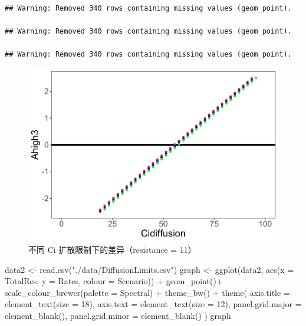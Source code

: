 \documentclass[
]{krantz}
\makeatletter
\newenvironment{Shaded}{\begin{snugshade}}{\end{snugshade}}
\newcommand{\AttributeTok}[1]{\textcolor[rgb]{0.77,0.63,0.00}{#1}}
\newcommand{\DecValTok}[1]{\textcolor[rgb]{0.00,0.00,0.81}{#1}}
\newcommand{\FunctionTok}[1]{\textcolor[rgb]{0.00,0.00,0.00}{#1}}
\newcommand{\NormalTok}[1]{#1}
\newcommand{\OtherTok}[1]{\textcolor[rgb]{0.56,0.35,0.01}{#1}}
\newcommand{\SpecialCharTok}[1]{\textcolor[rgb]{0.00,0.00,0.00}{#1}}
\newcommand{\StringTok}[1]{\textcolor[rgb]{0.31,0.60,0.02}{#1}}
\newenvironment{kframe}{%
\medskip{}
\setlength{\fboxsep}{.8em}
 \def\at@end@of@kframe{}%
 \ifinner\ifhmode%
  \def\at@end@of@kframe{\end{minipage}}%
  \begin{minipage}{\columnwidth}%
 \fi\fi%
 \def\FrameCommand##1{\hskip\@totalleftmargin \hskip-\fboxsep
 \colorbox{shadecolor}{##1}\hskip-\fboxsep
     \hskip-\linewidth \hskip-\@totalleftmargin \hskip\columnwidth}%
 \MakeFramed {\advance\hsize-\width
   \@totalleftmargin\z@ \linewidth\hsize
   \@setminipage}}%
 {\par\unskip\endMakeFramed%
 \at@end@of@kframe}
\renewenvironment{Shaded}{\begin{kframe}}{\end{kframe}}
\makeatother
\begin{document}
\begin{verbatim}
## Warning: Removed 340 rows containing missing values (geom_point).

## Warning: Removed 340 rows containing missing values (geom_point).

## Warning: Removed 340 rows containing missing values (geom_point).
\end{verbatim}

\begin{figure}
\centering
\includegraphics{bookdown_files/figure-latex/difuci11-1.pdf}
\caption{\label{fig:difuci11}不同 Ci 扩散限制下的差异（resistance = 11）}
\end{figure}

\begin{Shaded}
\begin{Highlighting}[]
\NormalTok{data2 }\OtherTok{\textless{}{-}} \FunctionTok{read.csv}\NormalTok{(}\StringTok{"./data/DiffusionLimits.csv"}\NormalTok{)}
\NormalTok{graph }\OtherTok{\textless{}{-}} \FunctionTok{ggplot}\NormalTok{(data2, }\FunctionTok{aes}\NormalTok{(}\AttributeTok{x =}\NormalTok{ TotalRes, }\AttributeTok{y =}\NormalTok{ Rates, }\AttributeTok{colour =}\NormalTok{ Scenario)) }\SpecialCharTok{+}
  \FunctionTok{geom\_point}\NormalTok{()}\SpecialCharTok{+}
  \FunctionTok{scale\_colour\_brewer}\NormalTok{(}\AttributeTok{palette =} \StringTok{\textquotesingle{}Spectral\textquotesingle{}}\NormalTok{) }\SpecialCharTok{+}
  \FunctionTok{theme\_bw}\NormalTok{() }\SpecialCharTok{+}
  \FunctionTok{theme}\NormalTok{(}
    \AttributeTok{axis.title =} \FunctionTok{element\_text}\NormalTok{(}\AttributeTok{size =} \DecValTok{18}\NormalTok{),}
    \AttributeTok{axis.text =} \FunctionTok{element\_text}\NormalTok{(}\AttributeTok{size =} \DecValTok{12}\NormalTok{),}
    \AttributeTok{panel.grid.major =} \FunctionTok{element\_blank}\NormalTok{(),}
    \AttributeTok{panel.grid.minor =} \FunctionTok{element\_blank}\NormalTok{()}
\NormalTok{  )}
\NormalTok{graph}
\end{Highlighting}
\end{Shaded}
\end{document}
